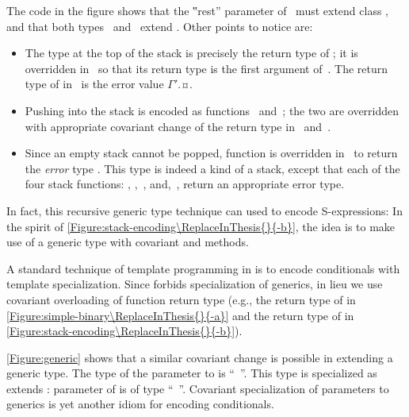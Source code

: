 \documentclass[a4paper,USenglish]{lipics-v2016}
\begin{document}
The code in the figure shows that the ‟rest” parameter of~ must extend class ,
  and that both types~ and~ extend .
Other points to notice are:
\begin{itemize}
  \item The type at the top of the stack is precisely the return type of ;
        it is overridden in~ so that its return type is the first argument of~.
        The return type of  in~ is the error value {$Γ'$.¤}.
  \item Pushing into the stack is encoded as functions~ and~;
        the two are overridden with appropriate covariant change of the return type in~ and~.
  \item Since an empty stack cannot be popped, function  is overridden in~ to return
    the \emph{error} type . This type is indeed a kind of a stack, except that each of the four stack
        functions: , ,~, and,~, return an appropriate error type.
\end{itemize}
In fact, this recursive generic type technique can used to encode S-expressions: In the spirit of
  \cref{Figure:stack-encoding\ReplaceInThesis{}{-b}}, the idea is to make use of a  generic type
  with covariant  and  methods.

A standard technique of template programming in \CC is to encode conditionals with template specialization.
Since \Java forbids specialization of generics, in lieu we use covariant overloading of function
return type (e.g., the return type of  in \cref{Figure:simple-binary\ReplaceInThesis{}{-a}} and the
  return type of  in \cref{Figure:stack-encoding\ReplaceInThesis{}{-b}}).

\cref{Figure:generic} shows that a similar covariant change is possible 
  in extending a generic type.
The type of the parameter  
  to  is ``\mbox{  }''.
This type is specialized as  extends :
  parameter  of  is of type  
  ``\mbox{  }''.
Covariant specialization of parameters to generics 
  is yet another idiom for encoding conditionals.
\end{document}
